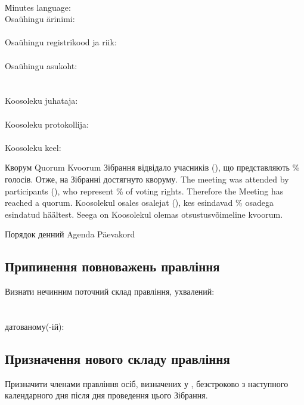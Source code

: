 \begin{Form}
\begin{paracol}{3}
{          \\
          Мinutes language:\\
        }
        { Osaühingu ärinimi:\\
          \\
          Osaühingu registrikood ja riik:\\
          \\
          Osaühingu asukoht:\\
          \\
          \\
          Koosoleku juhataja:\\
          \\
          Koosoleku protokollija:\\
          \\
          Koosoleku keel:\\
        }

      \clause
        {Кворум}
        {Quorum}
        {Kvoorum}
        {Зібрання відвідало  учасників (), що представляють \% голосів. Отже, на Зібранні достягнуто кворуму.}
        {The meeting was attended by  participants (), who represent \% of voting rights. Therefore the Meeting has reached a quorum.}
        {Koosolekul osales  osalejat (), kes esindavad \% osadega esindatud häältest. Seega on Koosolekul olemas otsustusvõimeline kvoorum.}

      \clause
        {Порядок денний}
        {Agenda}
        {Päevakord}
        { \subsection{Припинення повноважень правління}
          Визнати нечинним поточний склад правління, ухвалений:\\
          \\
          \\
          датованому(-ій):\\
          \subsection{Призначення нового складу правління}
          Призначити членами правління осіб, визначених у , безстроково з наступного календарного дня після дня проведення цього Зібрання.
}
\end{paracol}
\end{Form}

